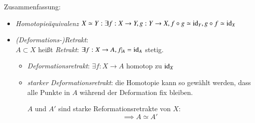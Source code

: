 \documentclass[a4paper,10pt]{scrartcl}
\begin{document}
\begin{seg}{Zusammenfassung:}
\begin{itemize}
 \item \emph{Homotopieäquivalenz} $X\simeq Y: \exists f: X\to Y, g: Y\to X, f\circ g \simeq \operatorname{id}_Y, g\circ f \simeq \operatorname{id}_X$
 \item \emph{(Deformations-)Retrakt}:\\
$A\subset X$ heißt \emph{Retrakt}: $\exists f: X\to A, f\vline_A=\id_A$ stetig.
\begin{itemize}
\item \emph{Deformationsretrakt}: $\exists f: X\to A$ homotop zu $\operatorname{id}_X$
\item \emph{starker Deformationsretrakt}: die Homotopie kann so gewählt werden, dass alle Punkte in $A$ während der Deformation fix bleiben.
\begin{figure}[H]
\centering
 \fixme[fig46]
\caption{}
\end{figure}
$A$ und $A'$ sind starke Reformationsretrakte von $X$:
\[
 \implies A \simeq A'
\]
\end{itemize}
\end{itemize}
\end{seg}
\end{document}
